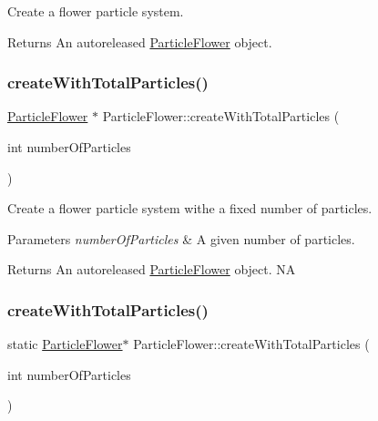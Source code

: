Create a flower particle system.

\begin{DoxyReturn}{Returns}
An autoreleased \hyperlink{classParticleFlower}{Particle\+Flower} object. 
\end{DoxyReturn}
\mbox{\label{classParticleFlower_a65c4463d6bdfcba4b95fcc1200b810e0}} 
\subsubsection{\texorpdfstring{create\+With\+Total\+Particles()}{createWithTotalParticles()}\hspace{0.1cm}{\footnotesize\ttfamily [1/2]}}
{\footnotesize\ttfamily \hyperlink{classParticleFlower}{Particle\+Flower} $\ast$ Particle\+Flower\+::create\+With\+Total\+Particles (\begin{DoxyParamCaption}\item[{int}]{number\+Of\+Particles }\end{DoxyParamCaption})\hspace{0.3cm}{\ttfamily [static]}}

Create a flower particle system withe a fixed number of particles.


\begin{DoxyParams}{Parameters}
{\em number\+Of\+Particles} & A given number of particles. \\
\hline
\end{DoxyParams}
\begin{DoxyReturn}{Returns}
An autoreleased \hyperlink{classParticleFlower}{Particle\+Flower} object.  NA 
\end{DoxyReturn}
\mbox{\label{classParticleFlower_a7fc629db7e755ab4cff3af5bde80193c}} 
\subsubsection{\texorpdfstring{create\+With\+Total\+Particles()}{createWithTotalParticles()}\hspace{0.1cm}{\footnotesize\ttfamily [2/2]}}
{\footnotesize\ttfamily static \hyperlink{classParticleFlower}{Particle\+Flower}$\ast$ Particle\+Flower\+::create\+With\+Total\+Particles (\begin{DoxyParamCaption}\item[{int}]{number\+Of\+Particles }\end{DoxyParamCaption})\hspace{0.3cm}{\ttfamily [static]}}

